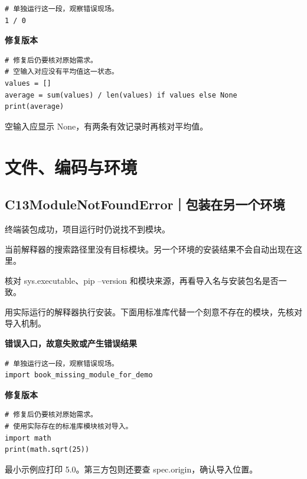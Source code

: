 \documentclass[UTF8,a4paper,oneside,openany,fontset=none,11pt]{ctexbook}
\newcommand{\code}[1]{\texttt{\detokenize{#1}}}
\newcommand{\CaseStep}[2]{\par\smallskip{\bfseries\color{Muted}#1}\enspace #2\par}
\begin{document}
\begin{lstlisting}[style=errorcode,title={错误复现（故意失败或错误结果）：\code{case_12_bad.py.txt}}]
# 单独运行这一段，观察错误现场。
1 / 0
\end{lstlisting}

\textbf{修复版本}

\begin{lstlisting}[title={\code{case_12.py}}]
# 修复后仍要核对原始需求。
# 空输入对应没有平均值这一状态。
values = []
average = sum(values) / len(values) if values else None
print(average)
\end{lstlisting}

\CaseStep{复验}{空输入应显示 None，有两条有效记录时再核对平均值。}

\section{文件、编码与环境}

\subsection*{C13\enspace ModuleNotFoundError｜包装在另一个环境}

\CaseStep{现象}{终端装包成功，项目运行时仍说找不到模块。}

\CaseStep{原因}{当前解释器的搜索路径里没有目标模块。另一个环境的安装结果不会自动出现在这里。}

\CaseStep{排查}{核对 sys.executable、pip --version 和模块来源，再看导入名与安装包名是否一致。}

\CaseStep{修复}{用实际运行的解释器执行安装。下面用标准库代替一个刻意不存在的模块，先核对导入机制。}

\textbf{错误入口，故意失败或产生错误结果}

\begin{lstlisting}[style=errorcode,title={错误复现（故意失败或错误结果）：\code{case_13_bad.py.txt}}]
# 单独运行这一段，观察错误现场。
import book_missing_module_for_demo
\end{lstlisting}

\textbf{修复版本}

\begin{lstlisting}[title={\code{case_13.py}}]
# 修复后仍要核对原始需求。
# 使用实际存在的标准库模块核对导入。
import math
print(math.sqrt(25))
\end{lstlisting}

\CaseStep{复验}{最小示例应打印 5.0。第三方包则还要查 spec.origin，确认导入位置。}
\end{document}
